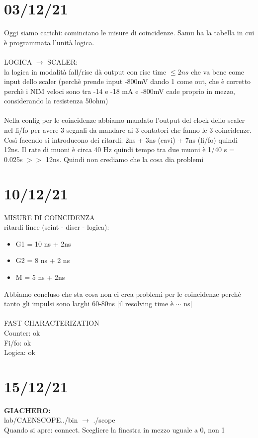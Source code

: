 \documentclass{article}
\begin{document}
\section{03/12/21}
Oggi siamo carichi: cominciano le misure di coincidenze. Samu ha la tabella in cui è programmata l'unità logica.\\\\
LOGICA $\rightarrow$ SCALER:\\
la logica in modalità fall/rise dà output con rise time $\leq 2ns$  che va bene come input dello scaler (perchè prende input -800mV dando 1 come out, che è corretto perchè i NIM veloci sono tra -14 e -18 mA e -800mV cade proprio in mezzo, considerando la resistenza 50ohm)\\\\
Nella config per le coincidenze abbiamo mandato l'output del clock dello scaler nel fi/fo per avere 3 segnali da mandare ai 3 contatori che fanno le 3 coincidenze. Così facendo si introducono dei ritardi: 2ns + 3ns (cavi) + 7ns (fi/fo) quindi 12ns. Il rate di muoni è circa 40 Hz quindi tempo tra due muoni è 1/40 s = 0.025s $>>$ 12ns. Quindi non crediamo che la cosa dia problemi


\section{10/12/21}
MISURE DI COINCIDENZA\\
ritardi linee (scint - discr - logica):
\begin{itemize}
    \item G1 = 10 ns + 2ns
    \item G2 = 8 ns + 2 ns
    \item M = 5 ns + 2ns
\end{itemize}
Abbiamo concluso che sta cosa non ci crea problemi per le coincidenze perché tanto gli impulsi sono larghi 60-80ns [il resolving time è $\sim$ ns]
\\\\
FAST CHARACTERIZATION\\
Counter: ok\\
Fi/fo: ok\\
Logica: ok

\section{15/12/21}
\textbf{GIACHERO:}\\
lab/CAENSCOPE../bin $\rightarrow$ ./scope\\
Quando si apre: connect. Scegliere la finestra in mezzo uguale a 0, non 1\\\\
\end{document}
